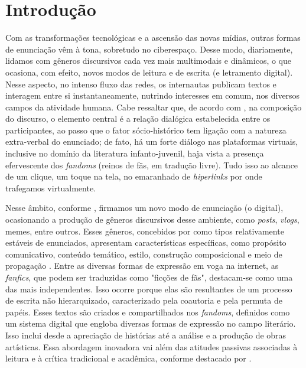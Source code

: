 \section{Introdução} \label{sec-introdução}

Com as transformações tecnológicas e a ascensão das novas mídias, outras
formas de enunciação vêm à tona, sobretudo no ciberespaço. Desse modo,
diariamente, lidamos com gêneros discursivos cada vez mais multimodais e
dinâmicos, o que ocasiona, com efeito, novos modos de leitura e de
escrita (e letramento digital). Nesse aspecto, no intenso fluxo das
redes, os internautas publicam textos e interagem entre si
instantaneamente, nutrindo interesses em comum, nos diversos campos da
atividade humana. Cabe ressaltar que, de acordo com \textcite{bakhtin2011}, na composição do discurso, o elemento central é a relação
dialógica estabelecida entre os participantes, ao passo que o fator
sócio-histórico tem ligação com a natureza extra-verbal do enunciado; de
fato, há um forte diálogo nas plataformas virtuais, inclusive no domínio
da literatura infanto-juvenil, haja vista a presença efervescente dos
\emph{fandoms} (reinos de fãs, em tradução livre). Tudo isso ao alcance
de um clique, um toque na tela, no emaranhado de \emph{hiperlinks} por
onde trafegamos virtualmente.

Nesse âmbito, conforme \textcite{xavier2002}, firmamos um novo modo de
enunciação (o digital), ocasionando a produção de gêneros discursivos
desse ambiente, como \emph{posts}, \emph{vlogs}, memes, entre outros.
Esses gêneros, concebidos por \textcite{bakhtin2011} como tipos
relativamente estáveis de enunciados, apresentam características
específicas, como propósito comunicativo, conteúdo temático, estilo,
construção composicional e meio de propagação \cite{bakhtin2011}. Entre as diversas formas
de expressão em voga na internet, as \emph{fanfics}, que podem ser
traduzidas como "ficções de fãs", destacam-se como uma das mais
independentes. Isso ocorre porque elas são resultantes de um processo de
escrita não hierarquizado, caracterizado pela coautoria e pela permuta
de papéis. Esses textos são criados e compartilhados nos \emph{fandoms},
definidos como um sistema digital que engloba diversas formas de
expressão no campo literário. Isso inclui desde a apreciação de
histórias até a análise e a produção de obras artísticas. Essa abordagem
inovadora vai além das atitudes passivas associadas à leitura e à
crítica tradicional e acadêmica, conforme destacado por \textcite{miranda2009}.

